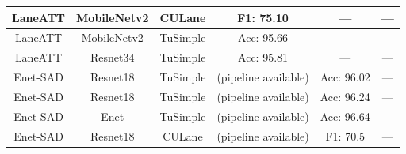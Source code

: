\begin{table}[]
\begin{tabular}{|c|c|c|c|c|c|}
LaneATT           & MobileNetv2                                                         & CULane           & F1: 75.10                                                             & —                                                                   & —                                                                                   \\ \hline
LaneATT           & MobileNetv2                                                         & TuSimple         & Acc: 95.66                                                            & —                                                                   & —                                                                                   \\ \hline
LaneATT           & Resnet34                                                            & TuSimple         & Acc: 95.81                                                            & —                                                                   & —                                                                                   \\ \hline
Enet-SAD          & Resnet18                                                            & TuSimple         & (pipeline available)                                                  & Acc: 96.02                                                          & —                                                                                   \\ \hline
Enet-SAD          & Resnet18                                                            & TuSimple         & (pipeline available)                                                  & Acc: 96.24                                                          & —                                                                                   \\ \hline
Enet-SAD          & Enet                                                                & TuSimple         & (pipeline available)                                                  & Acc: 96.64                                                          & —                                                                                   \\ \hline
Enet-SAD          & Resnet18                                                            & CULane           & (pipeline available)                                                  & F1: 70.5                                                            & —                                                                                   \\ \hline

\end{tabular}
\end{table}

